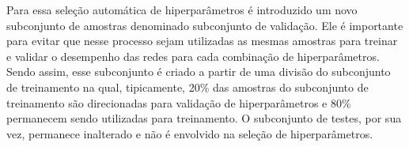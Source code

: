 Para essa seleção automática de hiperparâmetros é introduzido um novo subconjunto de amostras denominado subconjunto de validação.
Ele é importante para evitar que nesse processo sejam utilizadas as mesmas amostras para treinar e validar o desempenho das redes para cada combinação de hiperparâmetros.
Sendo assim, esse subconjunto é criado a partir de uma divisão do subconjunto de treinamento na qual, tipicamente, 20\% das amostras do subconjunto de treinamento são direcionadas para validação de hiperparâmetros e 80\% permanecem sendo utilizadas para treinamento.
O subconjunto de testes, por sua vez, permanece inalterado e não é envolvido na seleção de hiperparâmetros.



